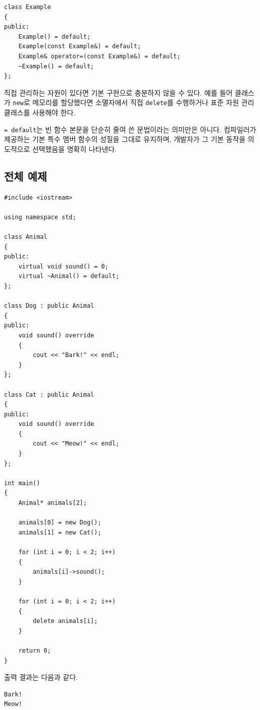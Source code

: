 \documentclass[11pt,a4paper]{article}
\begin{document}
\begin{lstlisting}
class Example
{
public:
    Example() = default;
    Example(const Example&) = default;
    Example& operator=(const Example&) = default;
    ~Example() = default;
};
\end{lstlisting}

직접 관리하는 자원이 있다면 기본 구현으로 충분하지 않을 수 있다. 예를 들어 클래스가 \texttt{new}로 메모리를 할당했다면 소멸자에서 직접 \texttt{delete}를 수행하거나 표준 자원 관리 클래스를 사용해야 한다.

\begin{importantbox}
\texttt{= default}는 빈 함수 본문을 단순히 줄여 쓴 문법이라는 의미만은 아니다. 컴파일러가 제공하는 기본 특수 멤버 함수의 성질을 그대로 유지하며, 개발자가 그 기본 동작을 의도적으로 선택했음을 명확히 나타낸다.
\end{importantbox}

\subsection{전체 예제}
\begin{lstlisting}
#include <iostream>

using namespace std;

class Animal
{
public:
    virtual void sound() = 0;
    virtual ~Animal() = default;
};

class Dog : public Animal
{
public:
    void sound() override
    {
        cout << "Bark!" << endl;
    }
};

class Cat : public Animal
{
public:
    void sound() override
    {
        cout << "Meow!" << endl;
    }
};

int main()
{
    Animal* animals[2];

    animals[0] = new Dog();
    animals[1] = new Cat();

    for (int i = 0; i < 2; i++)
    {
        animals[i]->sound();
    }

    for (int i = 0; i < 2; i++)
    {
        delete animals[i];
    }

    return 0;
}
\end{lstlisting}

출력 결과는 다음과 같다.

\begin{verbatim}
Bark!
Meow!
\end{verbatim}
\end{document}
